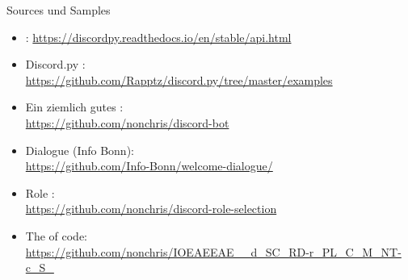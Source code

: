 \documentclass[12pt, aspectratio=169, usepdftitle=false]{beamer}
\begin{document}
\begin{frame}{Sources und Samples}
	\begin{itemize}
		\item {}: \url{https://discordpy.readthedocs.io/en/stable/api.html}
		
		\item Discord.py :\\
		\url{https://github.com/Rapptz/discord.py/tree/master/examples}
		
		\item Ein ziemlich gutes :\\
		\url{https://github.com/nonchris/discord-bot}
		
		\item {} Dialogue (Info Bonn):\\
		\url{https://github.com/Info-Bonn/welcome-dialogue/} 
		
		\item Role :\\
		\url{https://github.com/nonchris/discord-role-selection}
		
		\item The  of code:\\
		\url{https://github.com/nonchris/IOEAEEAE__d_SC_RD-r_PL_C_M_NT-c_S_}
		
	\end{itemize}
\end{frame}


\framecardfragen
\end{document}
